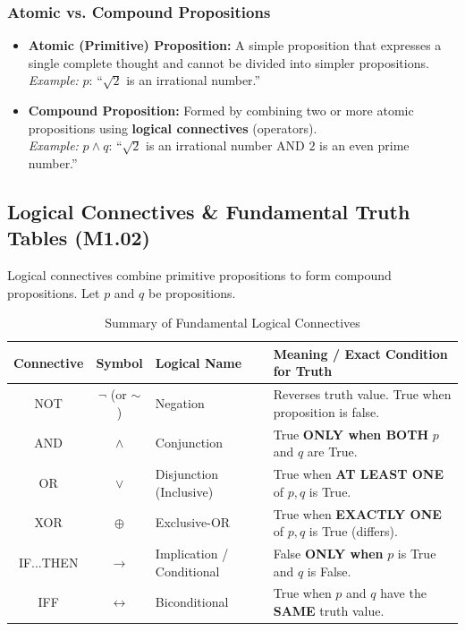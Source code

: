 \documentclass[11pt,a4paper]{article}
\begin{document}
\subsubsection*{Atomic vs. Compound Propositions}
\begin{itemize}[leftmargin=1.5em]
    \item \textbf{Atomic (Primitive) Proposition:} A simple proposition that expresses a single complete thought and cannot be divided into simpler propositions. \\
    \textit{Example:} $p$: ``$\sqrt{2}$ is an irrational number.''
    \item \textbf{Compound Proposition:} Formed by combining two or more atomic propositions using \textbf{logical connectives} (operators). \\
    \textit{Example:} $p \land q$: ``$\sqrt{2}$ is an irrational number AND $2$ is an even prime number.''
\end{itemize}

\subsection{Logical Connectives \& Fundamental Truth Tables (M1.02)}

Logical connectives combine primitive propositions to form compound propositions. Let $p$ and $q$ be propositions.

\begin{table}[htbp]
\centering
\small
\begin{tabularx}{\textwidth}{|c|c|l|X|}
\hline
\rowcolor{secondaryteal} \color{white}\textbf{Connective} & \color{white}\textbf{Symbol} & \color{white}\textbf{Logical Name} & \color{white}\textbf{Meaning / Exact Condition for Truth} \\ \hline
NOT & $\neg$ (or $\sim$) & Negation & Reverses truth value. True when proposition is false. \\ \hline
AND & $\land$ & Conjunction & True \textbf{ONLY when BOTH} $p$ and $q$ are True. \\ \hline
OR & $\lor$ & Disjunction (Inclusive) & True when \textbf{AT LEAST ONE} of $p, q$ is True. \\ \hline
XOR & $\oplus$ & Exclusive-OR & True when \textbf{EXACTLY ONE} of $p, q$ is True (differs). \\ \hline
IF...THEN & $\rightarrow$ & Implication / Conditional & False \textbf{ONLY when} $p$ is True and $q$ is False. \\ \hline
IFF & $\leftrightarrow$ & Biconditional & True when $p$ and $q$ have the \textbf{SAME} truth value. \\ \hline
\end{tabularx}
\caption{Summary of Fundamental Logical Connectives}
\end{table}
\end{document}
